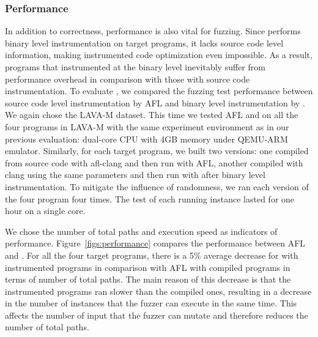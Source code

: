 \subsubsection{Performance}\label{sec:eval:performance}

In addition to correctness, performance is also vital for fuzzing. Since \sysname performs binary level instrumentation on target programs, it lacks source code level information, making instrumented code optimization even impossible. As a result, programs that instrumented at the binary level inevitably suffer from performance overhead in comparison with those with source code instrumentation. To evaluate \sysname, we compared the fuzzing test performance between source code level instrumentation by AFL and binary level instrumentation by \sysname. We again chose the LAVA-M dataset. This time we tested AFL and \sysname on all the four programs in LAVA-M with the same experiment environment as in our previous evaluation: dual-core CPU with 4GB memory under QEMU-ARM emulator. Similarly, for each target program, we built two versions: one compiled from source code with afl-clang and then run with AFL, another compiled with clang using the same parameters and then run with \sysname after binary level instrumentation. To mitigate the influence of randomness, we ran each version of the four program four times. The test of each running instance lasted for one hour on a single core.

We chose the number of total paths and execution speed as indicators of performance. Figure~\ref{figs:performance} compares the performance between AFL and \sysname. For all the four target programs, there is a 5\% average decrease for \sysname with instrumented programs in comparison with AFL with compiled programs in terms of number of total paths. The main reason of this decrease is that the instrumented programs ran slower than the compiled ones, resulting in a decrease in the number of instances that the fuzzer can execute in the same time. This affects the number of input that the fuzzer can mutate and therefore reduces the number of total paths.





